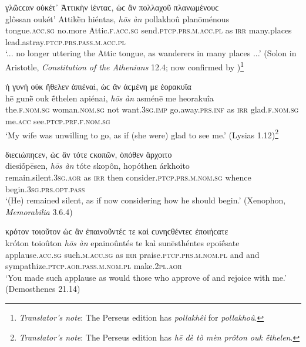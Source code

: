 \begin{exe}
\ex γλῶϲϲαν οὐκέτ᾽ Ἀττικὴν ἱένταϲ, ὡϲ ἂν πολλαχοῦ πλανωμένουϲ\\
\gll glôssan oukét' Attikḕn hiéntas, \emph{hōs} \emph{àn} pollakhoû planōménous\\
tongue.\textsc{acc.sg} no.more Attic.\textsc{f.acc.sg} send.\textsc{ptcp.prs.m.acc.pl} as \textsc{irr} many.places lead.astray.\textsc{ptcp.prs.pass.m.acc.pl}\\
\trans `... no longer uttering the Attic tongue, as wanderers in many places ...' (Solon in Aristotle, \textit{Constitution of the Athenians} 12.4; now confirmed by \citealp[31 line 10]{Kenyon1891})\footnote{\emph{Translator's note}: The Perseus edition has \textit{pollakhêi} for \textit{pollakhoû}.}
\label{hosan43}
\end{exe}

\begin{exe}
\ex ἡ γυνὴ οὐκ ἤθελεν ἀπιέναi, ὡϲ ἂν ἀϲμένη με ἑορακυῖα\\
\gll hē gunḕ ouk ḗthelen apiénai, \emph{hōs} \emph{àn} asménē me heorakuîa\\
the.\textsc{f.nom.sg} woman.\textsc{nom.sg} not want.\textsc{3sg.imp} go.away.\textsc{prs.inf} as \textsc{irr} glad.\textsc{f.nom.sg} me.\textsc{acc}
see.\textsc{ptcp.prf.f.nom.sg}\\
\trans `My wife was unwilling to go, as if (she were) glad to see me.' (Lysias 1.12)\footnote{\emph{Translator's note}: The Perseus edition has \textit{hē dè tò mèn prôton ouk ḗthelen}.}
\label{hosan44}
\end{exe}

\begin{exe}
\ex διεϲιώπηϲεν, ὡϲ ἂν τότε ϲκοπῶν, ὁπόθεν ἄρχοιτο\\
\gll diesiṓpēsen, \emph{hōs} \emph{àn} tóte skopôn, hopóthen árkhoito\\
remain.silent.\textsc{3sg.aor} as \textsc{irr} then consider.\textsc{ptcp.prs.m.nom.sg} whence begin.\textsc{3sg.prs.opt.pass}\\
\trans `(He) remained silent, as if now considering how he should begin.' (Xenophon, \textit{Memorabilia} 3.6.4)
\label{hosan45}
\end{exe}

\begin{exe}
\ex κρότον τοιοῦτον ὡϲ ἂν ἐπαινοῦντέϲ τε καὶ ϲυνηϲθέντεϲ ἐποιήϲατε\\
\gll króton toioûton \emph{hōs} \emph{àn} epainoûntés te kaì sunēsthéntes epoiḗsate\\
applause.\textsc{acc.sg} such.\textsc{m.acc.sg} as \textsc{irr}
praise.\textsc{ptcp.prs.m.nom.pl} and and sympathize.\textsc{ptcp.aor.pass.m.nom.pl} make.\textsc{2pl.aor}\\
\trans `You made such applause as would those who approve of and rejoice with me.' (Demosthenes 21.14)
\label{hosan46}
\end{exe}

